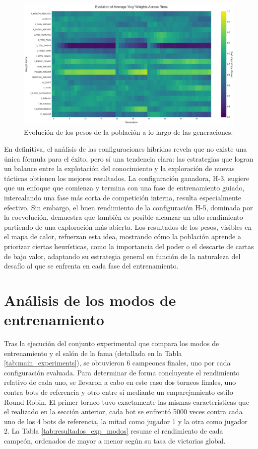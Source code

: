 \begin{figure}[H]
	\centering
	\includegraphics[width=1.0\textwidth]{img/424_heat_avg.png}
	\caption{Evolución de los pesos de la población a lo largo de las generaciones.}
	\label{fig:heat_avg_424}
\end{figure}

En definitiva, el análisis de las configuraciones híbridas revela que no existe una única fórmula para el éxito, pero sí una tendencia clara: las estrategias que logran un balance entre la explotación del conocimiento y la exploración de nuevas tácticas obtienen los mejores resultados. La configuración ganadora, H-3, sugiere que un enfoque que comienza y termina con una fase de entrenamiento guiado, intercalando una fase más corta de competición interna, resulta especialmente efectivo. Sin embargo, el buen rendimiento de la configuración H-5, dominada por la coevolución, demuestra que también es posible alcanzar un alto rendimiento partiendo de una exploración más abierta. Los resultados de los pesos, visibles en el mapa de calor, refuerzan esta idea, mostrando cómo la población aprende a priorizar ciertas heurísticas, como la importancia del poder o el descarte de cartas de bajo valor, adaptando su estrategia general en función de la naturaleza del desafío al que se enfrenta en cada fase del entrenamiento.

\section{Análisis de los modos de entrenamiento} \label{sec:analisis_modos_entrenamiento}

Tras la ejecución del conjunto experimental que compara los modos de entrenamiento y el salón de la fama (detallada en la Tabla \ref{tab:main_experiments}), se obtuvieron 6 campeones finales, uno por cada configuración evaluada. Para determinar de forma concluyente el rendimiento relativo de cada uno, se llevaron a cabo en este caso dos torneos finales, uno contra bots de referencia y otro entre sí mediante un emparejamiento estilo Round Robin. El primer torneo tuvo exactamente las mismas características que el realizado en la sección anterior, cada bot se enfrentó 5000 veces contra cada uno de los 4 bots de referencia, la mitad como jugador 1 y la otra como jugador 2. La Tabla \ref{tab:resultados_exp_modos} resume el rendimiento de cada campeón, ordenados de mayor a menor según su tasa de victorias global.

